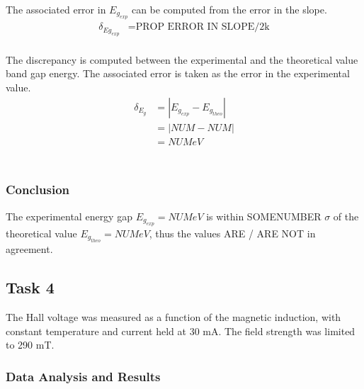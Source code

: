\documentclass[a4paper]{article}
\begin{document}
The associated error in $E_{g_{exp}}$ can be computed from the error in the slope.
\begin{align*}
\delta_{Eg_{exp}} &= \text{PROP ERROR IN SLOPE/2k} \\
\end{align*}

The discrepancy is computed between the experimental and the theoretical value band gap energy. The associated error is taken as the error in the experimental value.
\begin{align*}
\delta_{E_g} &= | E_{g_{exp}} - E_{g_{theo}} | \\
		     &= | NUM - NUM| \\
		     &= NUM eV \\
\end{align*}\\

\subsubsection{Conclusion}
The experimental energy gap $E_{g_{exp}} = NUM eV$ is within SOMENUMBER $\sigma$ of the theoretical value $E_{g_{theo}} = NUM eV$, thus the values  ARE / ARE NOT in agreement.

\subsection{Task 4}

\qq The Hall voltage was measured as a function of the magnetic
induction, with constant temperature and current held at 30 mA. 
The field strength was limited to 290 mT. 

\subsubsection{Data Analysis and Results}

\begin{figure}[H]
\centering
\label{task34plot}
\end{figure}
\end{document}
